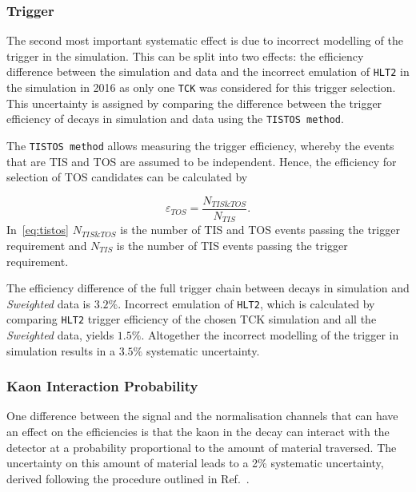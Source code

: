 \subsubsection{Trigger}
The second most important systematic effect is due to incorrect modelling of the trigger in the simulation. This can be split into two effects:
 the efficiency difference between the simulation and data and the incorrect emulation of \texttt{HLT2} in the simulation in 2016 as only one \texttt{TCK} was considered for this trigger selection. This uncertainty is assigned by comparing the difference between the trigger efficiency of \bjpsimumuk decays in simulation and data using the \texttt{TISTOS method}.

The \texttt{TISTOS method} allows measuring the trigger efficiency, whereby the events that are \gls{TIS} and \gls{TOS} are assumed to be independent. Hence, the efficiency
for selection of \gls{TOS} candidates can be calculated by

\begin{equation}
\varepsilon_{TOS} = \frac{N_{TIS\&TOS}}{N_{TIS}}.
\label{eq:tistos}
\end{equation}
In~\autoref{eq:tistos} $N_{TIS\&TOS}$ is the number of \gls{TIS} and \gls{TOS} events passing the trigger requirement and $N_{TIS}$ is the number of \gls{TIS} events passing the trigger requirement.

The efficiency difference of the full trigger chain between \bjpsik decays in simulation and \textit{Sweighted} data is $3.2\%$. Incorrect emulation of \texttt{HLT2}, which is calculated by comparing \texttt{HLT2} trigger efficiency of the chosen TCK simulation and all the \textit{Sweighted} data, yields $1.5\%$. Altogether the incorrect modelling of the trigger in simulation results in a $3.5\%$ systematic uncertainty.

\subsubsection{Kaon Interaction Probability}
One difference between the signal and the normalisation channels that can have an effect on the efficiencies is that the kaon in the decay \bjpsimumuk can interact with the detector at a probability proportional to the amount of material traversed. The uncertainty on this amount of material leads to a 2\% systematic
uncertainty, derived following the procedure outlined in Ref.~\cite{LHCb-DP-2013-002}.

